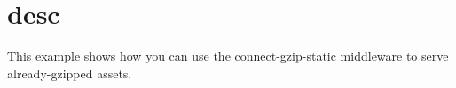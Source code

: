 \chapter{desc}
\hypertarget{md__d_1_2_g_i_t_2_food_link_2foodlink_8client_2node__modules_2bs-recipes_2recipes_2server_8gzipped_8assets_2desc}{}\label{md__d_1_2_g_i_t_2_food_link_2foodlink_8client_2node__modules_2bs-recipes_2recipes_2server_8gzipped_8assets_2desc}
This example shows how you can use the {\ttfamily connect-\/gzip-\/static} middleware to serve already-\/gzipped assets. 